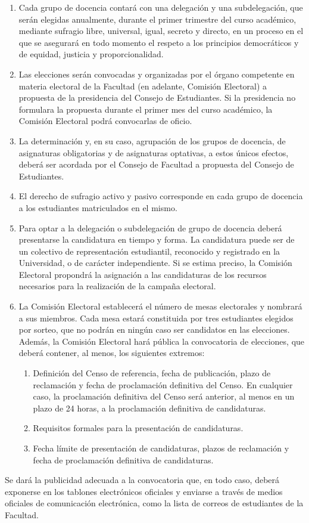\documentclass[11pt,a4paper]{article}
\begin{document}
\begin{enumerate}
\item Cada grupo de docencia contará con una delegación y una subdelegación, que serán elegidas anualmente, durante el primer trimestre del curso académico, mediante sufragio libre, universal, igual, secreto y directo, en un proceso en el que se asegurará en todo momento el respeto a los principios democráticos y de equidad, justicia y proporcionalidad.
\item Las elecciones serán convocadas y organizadas por el órgano competente en materia electoral de la Facultad (en adelante, Comisión Electoral) a propuesta de la presidencia del Consejo de Estudiantes. Si la presidencia no formulara la propuesta durante el primer mes del curso académico, la Comisión Electoral podrá convocarlas de oficio.
\item La determinación y, en su caso, agrupación de los grupos de docencia, de asignaturas obligatorias y de asignaturas optativas, a estos únicos efectos, deberá ser acordada por el Consejo de Facultad a propuesta del Consejo de Estudiantes.
\item El derecho de sufragio activo y pasivo corresponde en cada grupo de docencia a los estudiantes matriculados en el mismo.
\item Para optar a la delegación o subdelegación de grupo de docencia deberá presentarse la candidatura en tiempo y forma. La candidatura puede ser de un colectivo de representación estudiantil, reconocido y registrado en la Universidad, o de carácter independiente. Si se estima preciso, la Comisión Electoral propondrá la asignación a las candidaturas de los recursos necesarios para la realización de la campaña electoral.
\item La Comisión Electoral establecerá el número de mesas electorales y nombrará a sus miembros. Cada mesa estará constituida por tres estudiantes elegidos por sorteo, que no podrán en ningún caso ser candidatos en las elecciones. Además, la Comisión Electoral hará pública la convocatoria de elecciones, que deberá contener, al menos, los siguientes extremos:
  \begin{enumerate}
    \item Definición del Censo de referencia, fecha de publicación, plazo de reclamación y fecha de proclamación definitiva del Censo. En cualquier caso, la proclamación definitiva del Censo será anterior, al menos en un plazo de 24 horas, a la proclamación definitiva de candidaturas.
    \item Requisitos formales para la presentación de candidaturas.
    \item Fecha límite de presentación de candidaturas, plazos de reclamación y fecha de proclamación definitiva de candidaturas.
  \end{enumerate}
\end{enumerate}
Se dará la publicidad adecuada a la convocatoria que, en todo caso, deberá exponerse en los tablones electrónicos oficiales y enviarse a través de medios oficiales de comunicación electrónica, como la lista de correos de estudiantes de la Facultad.
\end{document}
